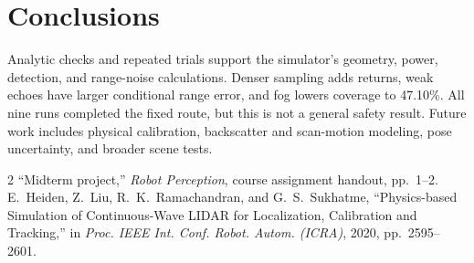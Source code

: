 \documentclass[11pt,letterpaper]{article}
\begin{document}
\section{Conclusions}\label{sec:conclusion}
Analytic checks and repeated trials support the simulator's geometry, power, detection, and range-noise calculations. Denser sampling adds returns, weak echoes have larger conditional range error, and fog lowers coverage to 47.10\%. All nine runs completed the fixed route, but this is not a general safety result. Future work includes physical calibration, backscatter and scan-motion modeling, pose uncertainty, and broader scene tests.

\clearpage
\begin{thebibliography}{2}
\setlength{\itemsep}{2pt}
 ``Midterm project,'' \emph{Robot Perception}, course assignment handout, pp.~1--2.
 E.~Heiden, Z.~Liu, R.~K.~Ramachandran, and G.~S.~Sukhatme, ``Physics-based Simulation of Continuous-Wave LIDAR for Localization, Calibration and Tracking,'' in \emph{Proc. IEEE Int. Conf. Robot. Autom. (ICRA)}, 2020, pp.~2595--2601.
\end{thebibliography}
\end{document}
